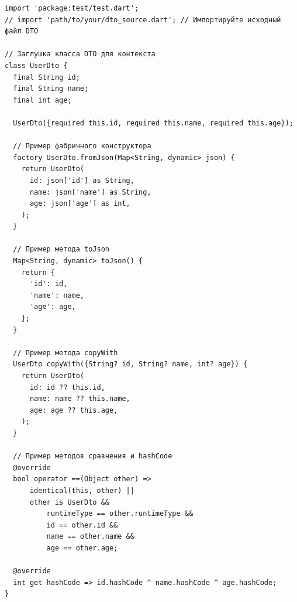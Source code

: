 \documentclass[14pt, russian]{scrartcl}
\begin{document}
\newpage
\begin{listing}[!htb]
\caption{Пример сгенерированного теста для DTO (Dart)}
\label{lst:dto_test_example}
\begin{verbatim}
import 'package:test/test.dart';
// import 'path/to/your/dto_source.dart'; // Импортируйте исходный файл DTO

// Заглушка класса DTO для контекста
class UserDto {
  final String id;
  final String name;
  final int age;

  UserDto({required this.id, required this.name, required this.age});

  // Пример фабричного конструктора
  factory UserDto.fromJson(Map<String, dynamic> json) {
    return UserDto(
      id: json['id'] as String,
      name: json['name'] as String,
      age: json['age'] as int,
    );
  }

  // Пример метода toJson
  Map<String, dynamic> toJson() {
    return {
      'id': id,
      'name': name,
      'age': age,
    };
  }

  // Пример метода copyWith
  UserDto copyWith({String? id, String? name, int? age}) {
    return UserDto(
      id: id ?? this.id,
      name: name ?? this.name,
      age: age ?? this.age,
    );
  }

  // Пример методов сравнения и hashCode
  @override
  bool operator ==(Object other) =>
      identical(this, other) ||
      other is UserDto &&
          runtimeType == other.runtimeType &&
          id == other.id &&
          name == other.name &&
          age == other.age;

  @override
  int get hashCode => id.hashCode ^ name.hashCode ^ age.hashCode;
}
\end{verbatim}
\end{listing}
\newpage
\end{document}
